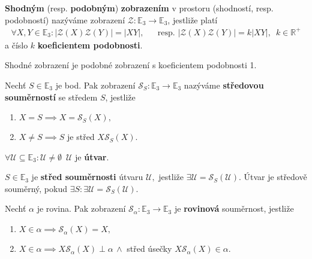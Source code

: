 \begin{definition}
\textbf{Shodným} (resp. \textbf{podobným}) \textbf{zobrazením} v prostoru (shodností,
resp. podobností) nazýváme zobrazení $\mathscr Z:
\mathbb E_3 \to \mathbb E_3$, jestliže platí
\begin{align*}
    \forall X, Y \in \mathbb E_3: |\mathscr Z(X)\mathscr Z(Y)| =|XY|, & & \textrm{resp. } |\mathscr Z(X)\mathscr Z(Y)|=k|XY|, \,\,\, k \in \mathbb R^+
\end{align*}
a číslo $k$ \textbf{koeficientem podobnosti}.
\end{definition}

\begin{pozn}
    Shodné zobrazení je podobné zobrazení s koeficientem podobnosti 1.
\end{pozn}

\begin{definition}
    Nechť $S\in \mathbb E_3$ je bod. Pak zobrazení $\mathscr S_S: \mathbb E_3 \to
    \mathbb E_3$ nazýváme \textbf{středovou souměrností} se středem $S$, jestliže
    \begin{enumerate}[$i.$]
    \item $X=S\implies X=\mathscr S_S(X),$
   	\item $X\ne S \implies S$ je střed $X\mathscr S_S(X).$
    \end{enumerate}
\end{definition}

\begin{definition}
    $\forall \mathscr U \subseteq \mathbb E_3: \mathscr U\ne \emptyset \,\,\, \mathscr
    U$ je \textbf{útvar}.
\end{definition}

\begin{definition}
    $S\in \mathbb E_3$ je \textbf{střed souměrnosti} útvaru $\mathscr U,$ jestliže
    $\exists \mathscr U = \mathscr S_S(\mathscr U).$ Útvar je středově souměrný,
    pokud $\exists S:\exists\mathscr U = \mathscr S_S(\mathscr U).$
\end{definition}

\begin{definition}
    Nechť $\alpha$ je rovina. Pak zobrazení $\mathscr S_\alpha:\mathbb E_3 \to
    \mathbb E_3$ je \textbf{rovinová}  souměrnost, jestliže
    \begin{enumerate}[$i.$]
    \item $X\in\alpha\implies \mathscr S_\alpha(X)=X,$
   	\item $X\in\alpha\implies X\mathscr S_\alpha(X) \perp\alpha\,\land$ střed úsečky
    $X\mathscr S_\alpha(X)\in \alpha.$
    \end{enumerate}
\end{definition}

